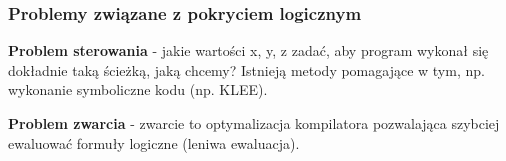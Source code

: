 \documentclass[../main.tex]{subfiles}
\begin{document}
    \subsubsection{Problemy związane z pokryciem logicznym}

    \textbf{Problem sterowania} - jakie wartości x, y, z zadać, aby program wykonał się dokładnie taką ścieżką,
    jaką chcemy? Istnieją metody pomagające w tym, np. wykonanie symboliczne kodu (np. KLEE).

    \textbf{Problem zwarcia} - zwarcie to optymalizacja kompilatora pozwalająca szybciej ewaluować
    formuły logiczne (leniwa ewaluacja).
\end{document}
